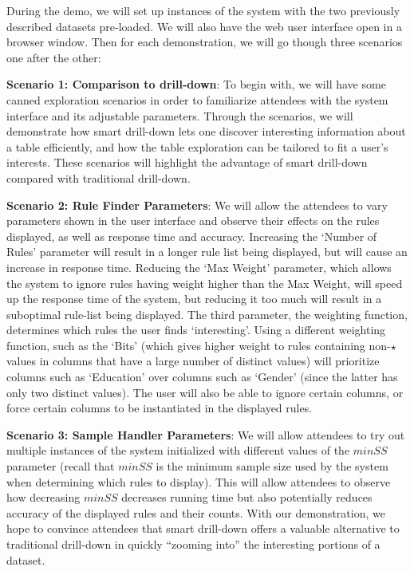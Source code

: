 During the demo, we will set up instances of the system with the two previously described datasets pre-loaded. We will also have the web user interface open in a browser window. Then for each demonstration, we will go though three scenarios one after the other:
\squishlist
\item {\bf Scenario 1: Comparison to drill-down}: To begin with, we will have some canned exploration scenarios in order to familiarize attendees with the system interface and its adjustable parameters. Through the scenarios, we will demonstrate how smart drill-down lets one discover interesting information about a table efficiently, and how the table exploration can be tailored to fit a user's interests. These scenarios will highlight the advantage of smart drill-down compared with traditional drill-down. 
\item {\bf Scenario 2: Rule Finder Parameters}: We will allow the attendees to vary parameters shown in the user interface and observe their effects on the rules displayed, as well as response time and accuracy. Increasing the `Number of Rules' parameter will result in a longer rule list being displayed, but will cause an increase in response time. Reducing the `Max Weight' parameter, which allows the system to ignore rules having weight higher than the Max Weight, will speed up the response time of the system, but reducing it too much will result in a suboptimal rule-list being displayed. The third parameter, the weighting function, determines which rules the user finds `interesting'. Using a different weighting function, such as the `Bits' (which gives higher weight to rules containing non-$\star$ values in columns that have a large number of distinct values) will prioritize columns such as `Education' over columns such as `Gender' (since the latter has only two distinct values). The user will also be able to ignore certain columns, or force certain columns to be instantiated in the displayed rules. 
\item {\bf Scenario 3: Sample Handler Parameters}: We will allow attendees to try out multiple instances of the system initialized with different values of the $minSS$  parameter (recall that $minSS$ is the minimum sample size used by the system when determining which rules to display). This will allow attendees to observe how decreasing $minSS$ decreases running time but also potentially reduces accuracy of the displayed rules and their counts.
\squishend
\noindent With our demonstration, we hope to convince attendees that smart drill-down offers
a valuable alternative to traditional drill-down in quickly ``zooming into'' the interesting portions of a dataset.
